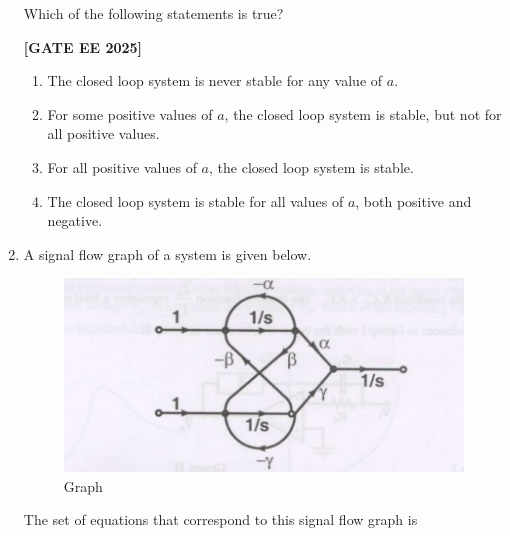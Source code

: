\documentclass[12pt]{article}
\begin{document}
\begin{enumerate}[leftmargin=*, label=\textbf{Q.\arabic*:}]
Which of the following statements is true?
 
\noindent \textbf{[GATE EE 2025]}
\begin{enumerate}
  \item The closed loop system is never stable for any value of $a$.
  \item For some positive values of $a$, the closed loop system is stable, but not for all positive values.
  \item For all positive values of $a$, the closed loop system is stable.
  \item The closed loop system is stable for all values of $a$, both positive and negative.
\end{enumerate}
\newpage
\item A signal flow graph of a system is given below.

\begin{figure}[H]\centering
\includegraphics[width=0.5\columnwidth]{figs/q40.png}
\caption{Graph}
\label{fig:q40}
\end{figure}


The set of equations that correspond to this signal flow graph is
 

\end{enumerate}
\end{document}
